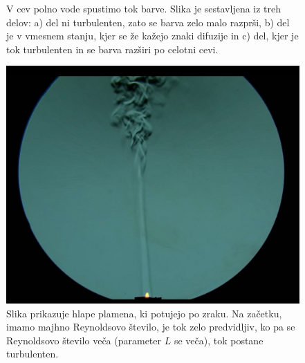 \documentclass[mat2, tisk]{fmfdelo}
\begin{document}
\begin{itemize}
\begin{figure}[h!]
\caption{V cev polno vode spustimo tok barve. Slika je sestavljena iz treh delov: a) del ni turbulenten, zato se barva zelo malo razprši,
b) del je v vmesnem stanju, kjer se že kažejo znaki difuzije in c) del, kjer je tok turbulenten in se barva razširi po celotni cevi.}
\label{fig:difus}
\end{figure}
\begin{figure}[h]
  \centering
\includegraphics[scale=0.19]{slike/Reynolds.jpeg}
\caption{Slika prikazuje hlape plamena, ki potujejo po zraku. Na začetku, imamo majhno Reynoldsovo število, je tok zelo predvidljiv,
ko pa se Reynoldsovo število veča (parameter $L$ se veča), tok postane turbulenten. \cite{veritasium2020turbulent}}
\end{figure}
\end{itemize}
\end{document}
